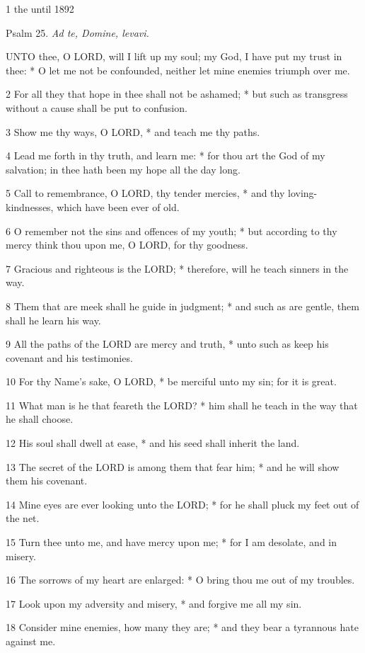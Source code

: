 1 the
until 1892

Psalm 25. \emph{Ad te, Domine, levavi.}

UNTO
thee, O LORD, will I lift up my soul; my God, I
have put my trust in thee: * O let me not be confounded, neither let
mine enemies triumph over me.

2 For all they that hope in thee shall not be ashamed;
* but such as transgress without a cause shall be put to confusion.

3 Show me thy ways, O LORD,
* and teach me thy paths.

4 Lead me forth in thy truth, and learn me: * for thou
art the God of my salvation; in thee hath been my hope all the day long.

5 Call to remembrance, O LORD,
thy tender mercies, * and thy loving-kindnesses, which have been ever
of old.

6 O remember not the sins and offences of my youth;
* but according to thy mercy think thou upon me, O LORD,
for thy goodness.

7 Gracious and righteous is the LORD;
* therefore, will he teach sinners in the way.

8 Them that are meek shall he guide in judgment; *
and such as are gentle, them shall he learn his way.

9 All the paths of the LORD
are mercy and truth, * unto such as keep his covenant and his testimonies.

10 For thy Name's sake, O LORD,
* be merciful unto my sin; for it is great.

11 What man is he that feareth the LORD?
* him shall he teach in the way that he shall choose.

12 His soul shall dwell at ease, * and his seed shall
inherit the land.

13 The secret of the LORD is
among them that fear him; * and he will show them his covenant.

14 Mine eyes are ever looking unto the LORD;
* for he shall pluck my feet out of the net.

15 Turn thee unto me, and have mercy upon me; * for
I am desolate, and in misery.

16 The sorrows of my heart are enlarged: * O bring
thou me out of my troubles.

17 Look upon my adversity and misery, * and forgive
me all my sin.

18 Consider mine enemies, how many they are; * and
they bear a tyrannous hate against me.


